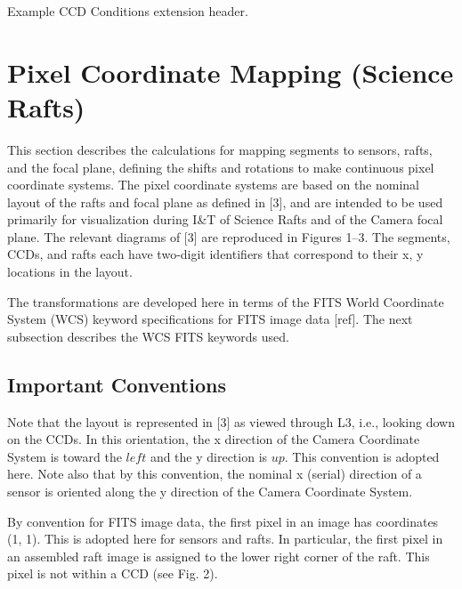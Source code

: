 \documentclass{article}[12pt]
\begin{document}
{\begin{table}
\begin{alltt}

\end{alltt}
\caption{Example CCD Conditions extension header.\label{table:ccd_cond}}
\end{table}


\section{Pixel Coordinate Mapping (Science Rafts)\label{sec:pixelcoords}}
This section describes the calculations for mapping segments to sensors, rafts, and the focal plane, defining the shifts and rotations to make continuous pixel coordinate systems.  The pixel coordinate systems are based on the nominal layout of the rafts and focal plane as defined in [3], and are intended to be used primarily for visualization during I\&T of Science Rafts and of the Camera focal plane.  The relevant diagrams of [3] are reproduced in Figures 1--3.  The segments, CCDs, and rafts each have two-digit identifiers that correspond to their x, y locations in the layout.

The transformations are developed here in terms of the FITS World Coordinate System (WCS) keyword specifications for FITS image data [ref].  The next subsection describes the WCS FITS keywords used.




\subsection{Important Conventions}
Note that the layout is represented in [3] as viewed through L3, i.e., looking down on the CCDs.  In this orientation, the x direction of the Camera Coordinate System is toward the $left$ and the y direction is $up$.  This convention is adopted here.  Note also that by this convention, the nominal x (serial) direction of a sensor is oriented along the y direction of the Camera Coordinate System.  

By convention for FITS image data, the first pixel in an image has coordinates (1, 1).  This is adopted here for sensors and rafts.  In particular, the first pixel in an assembled raft image is assigned to the lower right corner of the raft.  This pixel is not within a CCD (see Fig. 2). 

}
\end{document}
